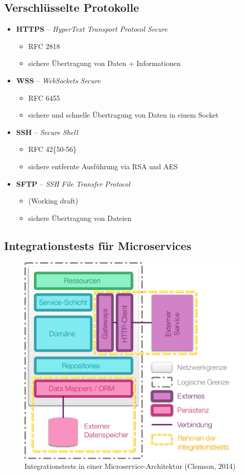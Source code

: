 \documentclass{beamer}
\begin{document}
\subsection{Verschlüsselte Protokolle}
\begin{frame}{\insertsubsection}
	\begin{itemize}
		\item \textbf{HTTPS} – \textit{HyperText Transport Protocol Secure}
		\begin{itemize}
			\item RFC 2818
			\item sichere Übertragung von Daten + Informationen
		\end{itemize}
		\item \textbf{WSS} – \textit{WebSockets Secure}
		\begin{itemize}
			\item RFC 6455
			\item sichere und schnelle Übertragung von Daten in einem Socket
		\end{itemize}
		\item \textbf{SSH} – \textit{Secure Shell}
		\begin{itemize}
			\item RFC 42\{50-56\}
			\item sichere entfernte Ausführung via RSA und AES
		\end{itemize}
		\item \textbf{SFTP} – \textit{SSH File Transfer Protocol}
		\begin{itemize}
			\item (Working draft)
			\item sichere Übertragung von Dateien
		\end{itemize}
	\end{itemize}
\end{frame}

\subsection{Integrationstests für Microservices}
\begin{frame}{\insertsubsection}
	\begin{figure}[h]
		\centering
		\includegraphics[width=.6\linewidth]{img/inte}
		\caption{Integrationstests in einer Microservice-Architektur (Clemson, 2014)}
		\label{fig:integrationstests}
	\end{figure}
\end{frame}
\end{document}
